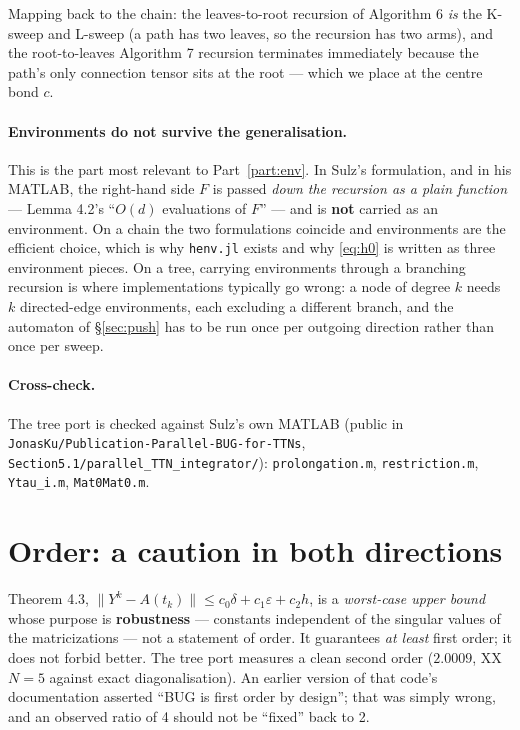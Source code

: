 \documentclass[11pt,a4paper]{article}
\newcommand{\code}[1]{\texttt{\small #1}}
\begin{document}
\noindent
Mapping back to the chain: the leaves-to-root recursion of Algorithm 6 \emph{is} the K-sweep and
L-sweep (a path has two leaves, so the recursion has two arms), and the root-to-leaves
Algorithm 7 recursion terminates immediately because the path's only connection tensor sits at
the root --- which we place at the centre bond $c$.

\paragraph{Environments do not survive the generalisation.} This is the part most relevant to
Part~\ref{part:env}. In Sulz's formulation, and in his MATLAB, the right-hand side $F$ is passed
\emph{down the recursion as a plain function} --- Lemma 4.2's ``$O(d)$ evaluations of $F$'' ---
and is \textbf{not} carried as an environment. On a chain the two formulations coincide and
environments are the efficient choice, which is why \code{henv.jl} exists and why
\eqref{eq:h0} is written as three environment pieces. On a tree, carrying environments through a
branching recursion is where implementations typically go wrong: a node of degree $k$ needs
$k$ directed-edge environments, each excluding a different branch, and the automaton of
\S\ref{sec:push} has to be run once per outgoing direction rather than once per sweep.

\paragraph{Cross-check.} The tree port is checked against Sulz's own MATLAB (public in
\code{JonasKu/Publication-Parallel-BUG-for-TTNs},
\code{Section5.1/parallel\_TTN\_integrator/}): \code{prolongation.m}, \code{restriction.m},
\code{Ytau\_i.m}, \code{Mat0Mat0.m}.

\section{Order: a caution in both directions}

Theorem 4.3, $\|Y^k-A(t_k)\|\le c_0\delta+c_1\varepsilon+c_2h$, is a \emph{worst-case upper
bound} whose purpose is \textbf{robustness} --- constants independent of the singular values of
the matricizations --- not a statement of order. It guarantees \emph{at least} first order; it
does not forbid better. The tree port measures a clean second order ($2.0009$, XX $N=5$ against
exact diagonalisation). An earlier version of that code's documentation asserted ``BUG is first
order by design''; that was simply wrong, and an observed ratio of 4 should not be ``fixed''
back to 2.
\end{document}
